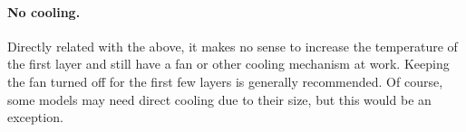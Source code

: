 \paragraph{No cooling.} %
\label{par:no_cooling}
Directly related with the above, it makes no sense to increase the temperature of the first layer and still have a fan or other cooling mechanism at work.  Keeping the fan turned off for the first few layers is generally recommended.  Of course, some models may need direct cooling due to their size, but this would be an exception.
